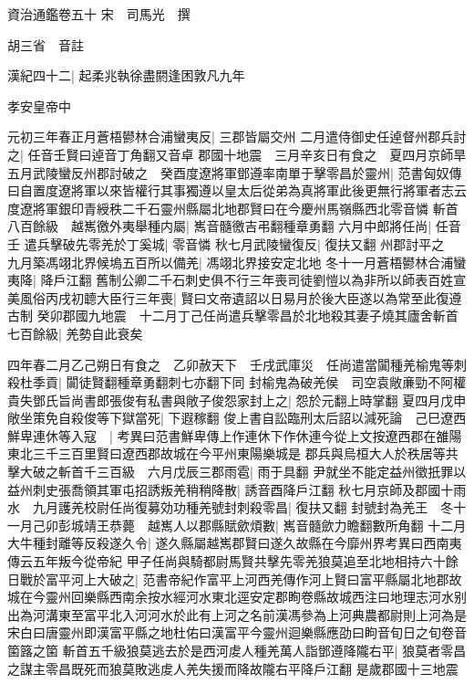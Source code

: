 資治通鑑卷五十
宋　司馬光　撰

胡三省　音註

漢紀四十二|{
	起柔兆執徐盡閼逢困敦凡九年}


孝安皇帝中

元初三年春正月蒼梧鬰林合浦蠻夷反|{
	三郡皆屬交州}
二月遣侍御史任逴督州郡兵討之|{
	任音壬賢曰逴音丁角翻又音卓}
郡國十地震　三月辛亥日有食之　夏四月京師旱五月武陵蠻反州郡討破之　癸酉度遼將軍鄧遵率南單于擊零昌於靈州|{
	范書匈奴傳曰自置度遼將軍以來皆權行其事獨遵以皇太后從弟為真將軍此後更無行將軍者志云度遼將軍銀印青綬秩二千石靈州縣屬北地郡賢曰在今慶州馬嶺縣西北零音憐}
斬首八百餘級　越嶲徼外夷舉種内屬|{
	嶲音髓徼吉弔翻種章勇翻}
六月中郎將任尚|{
	任音壬}
遣兵擊破先零羌於丁奚城|{
	零音憐}
秋七月武陵蠻復反|{
	復扶又翻}
州郡討平之　九月築馮翊北界候塢五百所以備羌|{
	馮翊北界接安定北地}
冬十一月蒼梧鬰林合浦蠻夷降|{
	降戶江翻}
舊制公卿二千石刺史俱不行三年喪司徒劉愷以為非所以師表百姓宣美風俗丙戌初聼大臣行三年喪|{
	賢曰文帝遺詔以日易月於後大臣遂以為常至此復遵古制}
癸卯郡國九地震　十二月丁己任尚遣兵擊零昌於北地殺其妻子燒其廬舍斬首七百餘級|{
	羌勢自此衰矣}


四年春二月乙己朔日有食之　乙卯赦天下　壬戌武庫災　任尚遣當闐種羌榆鬼等刺殺杜季貢|{
	闐徒賢翻種章勇翻刺七亦翻下同}
封榆鬼為破羌侯　司空袁敞亷勁不阿權貴失鄧氏旨尚書郎張俊有私書與敞子俊怨家封上之|{
	怨於元翻上時掌翻}
夏四月戊申敞坐策免自殺俊等下獄當死|{
	下遐稼翻}
俊上書自訟臨刑太后詔以減死論　己巳遼西鮮卑連休等入寇　|{
	考異曰范書鮮卑傳上作連休下作休連今從上文按遼西郡在雒陽東北三千三百里賢曰遼西郡故城在今平州東陽樂城是}
郡兵與烏桓大人於秩居等共擊大破之斬首千三百級　六月戊辰三郡雨雹|{
	雨于具翻}
尹就坐不能定益州徵扺罪以益州刺史張喬領其軍屯招誘叛羌稍稍降散|{
	誘音酉降戶江翻}
秋七月京師及郡國十雨水　九月護羌校尉任尚復募効功種羌號封刺殺零昌|{
	復扶又翻}
封號封為羌王　冬十一月己卯彭城靖王恭薨　越嶲人以郡縣賦歛煩數|{
	嶲音髓歛力瞻翻數所角翻}
十二月大牛種封離等反殺遂久令|{
	遂久縣屬越嶲郡賢曰遂久故縣在今靡州界考異曰西南夷傳云五年叛今從帝紀}
甲子任尚與騎都尉馬賢共擊先零羌狼莫追至北地相持六十餘日戰於富平河上大破之|{
	范書帝紀作富平上河西羌傳作河上賢曰富平縣屬北地郡故城在今靈州回樂縣西南余按水經河水東北逕安定郡眴卷縣故城西注曰地理志河水别出為河溝東至富平北入河河水於此有上河之名前漢馮參為上河典農都尉則上河為是宋白曰唐靈州即漢富平縣之地杜佑曰漢富平今靈州迴樂縣應劭曰眗音旬日之旬卷音箘簬之箘}
斬首五千級狼莫逃去於是西河䖍人種羌萬人詣鄧遵降隴右平|{
	狼莫者零昌之謀主零昌既死而狼莫敗逃䖍人羌失援而降故隴右平降戶江翻}
是歲郡國十三地震

